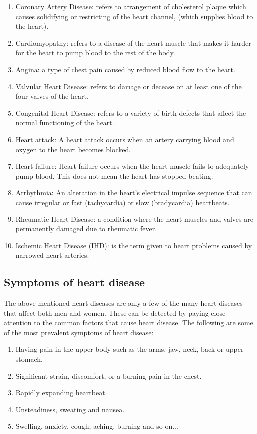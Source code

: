\begin{enumerate}[label=(\alph*)]
	\item{Coronary Artery Disease: refers to arrangement of cholesterol plaque which causes solidifying or restricting of the heart channel, (which supplies blood to the heart).}
	\item{Cardiomyopathy: refers to a disease of the heart muscle that makes it harder for the heart to pump blood to the rest of the body.}
	\item{Angina: a type of chest pain caused by reduced blood flow to the heart.}
	\item{Valvular Heart Disease: refers to damage or decease on at least one of the four valves of the heart.}
	\item{Congenital Heart Disease: refers to a variety of birth defects that affect the normal functioning of the heart.}
	\item{Heart attack: A heart attack occurs when an artery carrying blood and oxygen to the heart becomes blocked.}
	\item {Heart failure: Heart failure occurs when the heart muscle fails to adequately pump blood. This does not mean the heart has stopped beating. }
	\item{Arrhythmia: An alteration in the heart's electrical impulse sequence that can cause irregular or fast (tachycardia) or slow (bradycardia) heartbeats. }
	\item{Rheumatic Heart Disease: a condition where the heart muscles and valves are permanently damaged due to rheumatic fever.}
	
	\item{Ischemic Heart Disease (IHD): is the term given to heart problems caused by narrowed heart arteries.}
	
\end{enumerate}

\subsection{Symptoms of heart disease}
The above-mentioned heart diseases are only a few of the many heart diseases that affect both men and women. These can be detected by paying close attention to the common factors that cause heart disease. The following are some of the most prevalent symptoms of heart disease:

\begin{enumerate}[label=(\alph*)]
	\item{Having pain in the upper body such as the arms, jaw, neck, back or upper stomach.}
	\item{Significant strain, discomfort, or a burning pain in the chest.}
	\item{Rapidly expanding heartbeat.}
	\item{Unsteadiness, sweating and nausea.}
	\item{Swelling, anxiety, cough, aching, burning and so on...}
\end{enumerate}

